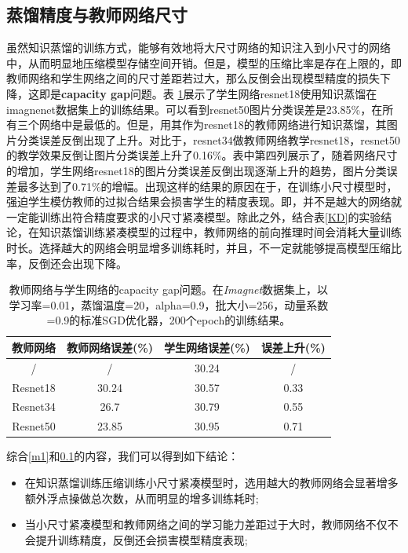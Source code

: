 \subsection{蒸馏精度与教师网络尺寸}
\label{m2}
虽然知识蒸馏的训练方式，能够有效地将大尺寸网络的知识注入到小尺寸的网络中，从而明显地压缩模型存储空间开销。但是，模型的压缩比率是存在上限的，即教师网络和学生网络之间的尺寸差距若过大，那么反倒会出现模型精度的损失下降，这即是\textbf{capacity gap}\cite{gou2021knowledge,guo2020reducing}问题。表 \ref{gap}展示了学生网络resnet18使用知识蒸馏在imagnenet数据集上的训练结果。可以看到resnet50图片分类误差是23.85\%，在所有三个网络中是最低的。但是，用其作为resnet18的教师网络进行知识蒸馏，其图片分类误差反倒出现了上升。对比于，resnet34做教师网络教学resnet18，resnet50的教学效果反倒让图片分类误差上升了0.16\%。表中第四列展示了，随着网络尺寸的增加，学生网络resnet18的图片分类误差反倒出现逐渐上升的趋势，图片分类误差最多达到了0.71\%的增幅。出现这样的结果的原因在于，在训练小尺寸模型时，强迫学生模仿教师的过拟合结果会损害学生的精度表现。即，并不是越大的网络就一定能训练出符合精度要求的小尺寸紧凑模型。除此之外，结合表\ref{KD}的实验结论，在知识蒸馏训练紧凑模型的过程中，教师网络的前向推理时间会消耗大量训练时长。选择越大的网络会明显增多训练耗时，并且，不一定就能够提高模型压缩比率，反倒还会出现下降。
\begin{table}[]
	\begin{tabular}{cccc}

		\hline
		\caption{教师网络与学生网络的capacity gap\cite{gou2021knowledge,guo2020reducing}问题。在\emph{Imagnet}数据集上，以学习率=0.01，蒸馏温度=20，alpha=0.9，批大小=256，动量系数=0.9的标准SGD优化器，200个epoch的训练结果\cite{cho2019efficacy}。}
		\label{gap}
		\textbf{教师网络} &\textbf{教师网络误差(\%)} &\textbf{学生网络误差(\%)}   &\textbf{误差上升(\%)}\\ \hline
		/                          & /                               & 30.24    & /                       \\ 
		Resnet18                   & 30.24                           & 30.57    & 0.33                      \\ 
		Resnet34                   & 26.7                            & 30.79    & 0.55                      \\ 
		Resnet50                   & 23.85                           & 30.95    & 0.71                \\ \hline
	\end{tabular}
\end{table}

综合\ref{m1}和\ref{m2}的内容，我们可以得到如下结论：
\begin{itemize}
	\item 在知识蒸馏训练压缩训练小尺寸紧凑模型时，选用越大的教师网络会显著增多额外浮点操做总次数，从而明显的增多训练耗时;
	\item 当小尺寸紧凑模型和教师网络之间的学习能力差距过于大时，教师网络不仅不会提升训练精度，反倒还会损害模型精度表现;
\end{itemize}


